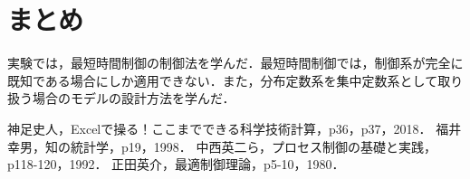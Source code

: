 \documentclass[12pt]{jsarticle}
\begin{document}
\section{まとめ}
実験では，最短時間制御の制御法を学んだ．最短時間制御では，制御系が完全に既知である場合にしか適用できない．また，分布定数系を集中定数系として取り扱う場合のモデルの設計方法を学んだ．

\begin{thebibliography}{9}
   神足史人，Excelで操る！ここまでできる科学技術計算，p36，p37，2018．
   福井幸男，知の統計学，p19，1998．
   中西英二ら，プロセス制御の基礎と実践，p118-120，1992．
   正田英介，最適制御理論，p5-10，1980．
\end{thebibliography}
\end{document}
